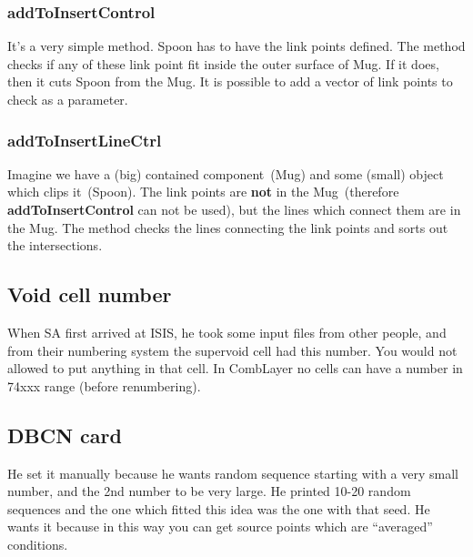 \subsubsection{addToInsertControl}
It's a very simple method. Spoon has to have the link points defined.
The method checks if any of these link point fit inside the outer surface of Mug. If it does, then it cuts Spoon from the Mug.
It is possible to add a vector of link points to check as a parameter.

\subsubsection{addToInsertLineCtrl}
Imagine we have a (big) contained component~(Mug) and some (small) object which clips it~(Spoon). The link points are {\bf not} in the Mug~(therefore {\bf addToInsertControl} can not be used), but the lines which connect them are in the Mug.
The method checks the lines connecting the link points and sorts out the intersections.

\subsection{Void cell number}
When SA first arrived at ISIS, he took some input files from other people, and from their numbering system the supervoid cell had this number.
You would not allowed to put anything in that cell. In CombLayer no cells can have a number in 74xxx range (before renumbering).

\subsection{DBCN card}
He set it manually because he wants random sequence starting with a very small number, and the 2nd number to be very large.
He printed 10-20 random sequences and the one which fitted this idea was the one with that seed.
He wants it because in this way you can get source points which are ``averaged'' conditions.